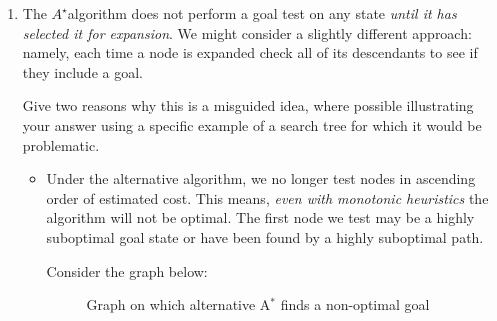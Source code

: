 \documentclass[10pt,\jkfside,a4paper]{article}
\newcommand{\astar}{\ensuremath{A^\star}}
\begin{document}
\begin{enumerate}
\item The \astar algorithm does not perform a goal test on any state 
\textit{until it has selected it for expansion}. We might consider a 
slightly different approach: namely, each time a node is expanded check all 
of its descendants to see if they include a goal.

Give two reasons why this is a misguided idea, where possible illustrating 
your answer using a specific example of a search tree for which it would be 
problematic.

\begin{itemize}

\item Under the alternative algorithm, we no longer test nodes in ascending
order of estimated cost. This means, \textit{even with monotonic heuristics}
the algorithm will not be optimal. The first node we test may be a highly
suboptimal goal state or have been found by a highly suboptimal path.

Consider the graph below:
\begin{figure}[H]
\centering
{}
\caption{Graph on which alternative A$^*$ finds a non-optimal goal}
\end{figure}


\end{itemize}
\end{enumerate}
\end{document}

